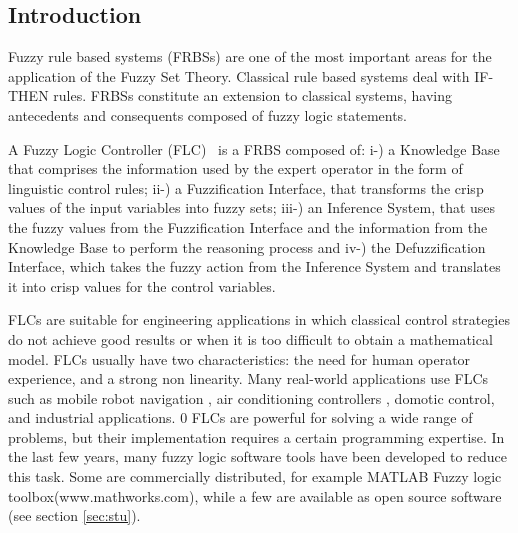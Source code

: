 \documentclass[11pt,twoside]{article}
\begin{document}
\vspace*{10pt}\textlineskip
\begin{multicols}{2}

\section{Introduction}

Fuzzy rule based systems (FRBSs) are one of the most important areas for the application of the Fuzzy Set Theory\cite{Zadeh65}. 
Classical rule based systems deal with IF-THEN rules.
FRBSs constitute an extension to classical systems, having antecedents and consequents composed of fuzzy logic statements.

A Fuzzy Logic Controller (FLC)~\cite{Lee90,DHR93,YF94,Bon94} is a FRBS composed of: 
	i-) a Knowledge Base that comprises the information used by the expert operator in the form of linguistic control rules; 
	ii-) a Fuzzification Interface, that transforms the crisp values of the input variables into fuzzy sets;
	iii-) an Inference System, that uses the fuzzy values from the Fuzzification Interface and the information from the Knowledge Base to perform the reasoning process and 
	iv-) the Defuzzification Interface, which takes the fuzzy action from the Inference System and translates it into crisp values for the control variables.

FLCs are suitable for engineering applications in which classical control strategies do not achieve good results or when it is too difficult to obtain a mathematical model.
FLCs usually have two characteristics: the need for human operator experience, and a strong non linearity.
Many real-world applications use FLCs~\cite{PDH97} such as mobile robot navigation \cite{MAA10,JCh2011}, air conditioning controllers \cite{Alc12,Cho11}, domotic control\cite{Cha12,AL05}, and industrial applications\cite{ZG2012,Demir12}.
0
FLCs are powerful for solving a wide range of problems, but their implementation requires a certain programming expertise.
In the last few years, many fuzzy logic software tools have been developed to reduce this task. 
Some are commercially distributed, for example MATLAB Fuzzy logic toolbox(www.mathworks.com), while a few are available as open source software (see section \ref{sec:stu}).


\end{multicols}
\end{document}
